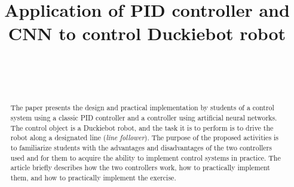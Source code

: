 \documentclass[conference]{IEEEtran}
\begin{document}
%
\title{Application of PID controller and CNN to control Duckiebot robot}


\author{
\\[0.4cm]
\and
{}
\\
}


\maketitle              %

\begin{abstract}
The paper presents the design and practical implementation by students of a control system
using a classic PID controller and a controller using artificial neural networks.
The control object is a Duckiebot robot, and the task it is to perform is to drive the robot along a designated line (\emph{line follower}). The purpose of the proposed activities is to familiarize students with the advantages and disadvantages of the two controllers used and for them to acquire the ability to implement control systems in practice. 
The article briefly describes how the two controllers work, how to practically implement them, and how to practically implement the exercise.
\end{abstract}
\end{document}
